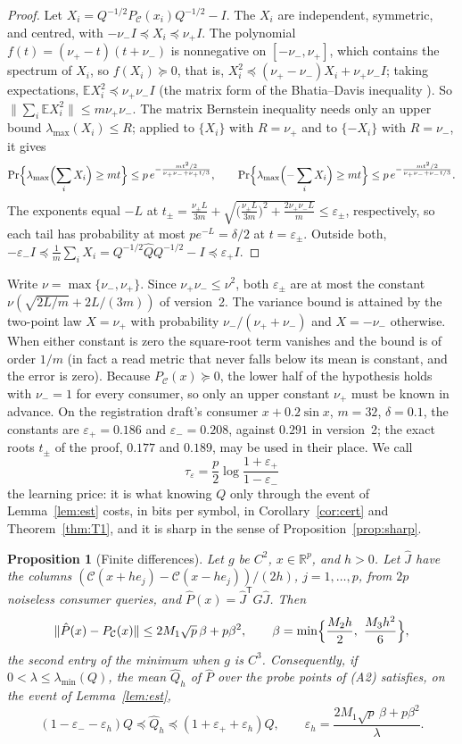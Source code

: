 \documentclass[11pt,onecolumn]{IEEEtran}
\newtheorem{proposition}[theorem]{Proposition}
\newcommand{\E}{\mathbb{E}}
\newcommand{\R}{\mathbb{R}}
\newcommand{\PC}{P_{\mathcal C}}
\newcommand{\nup}{\nu_{+}}
\newcommand{\num}{\nu_{-}}
\newcommand{\epp}{\varepsilon_{+}}
\newcommand{\emm}{\varepsilon_{-}}
\newcommand{\lmin}{\lambda_{\min}}
\newcommand{\lmax}{\lambda_{\max}}
\begin{document}
\begin{proof}
Let $X_i=Q^{-1/2}\PC(x_i)Q^{-1/2}-I$. The $X_i$ are independent, symmetric, and
centred, with $-\num I\preceq X_i\preceq\nup I$. The polynomial
$f(t)=(\nup-t)(t+\num)$ is nonnegative on $[-\num,\nup]$, which contains the
spectrum of $X_i$, so $f(X_i)\succeq0$, that is,
$X_i^2\preceq(\nup-\num)X_i+\nup\num I$; taking expectations,
$\E X_i^2\preceq\nup\num I$ (the matrix form of the Bhatia--Davis inequality
\cite{bhatiadavis}). So $\|\sum_i\E X_i^2\|\le m\nup\num$. The matrix
Bernstein inequality \cite[Theorem~1.4]{tropp2012} needs only an upper bound
$\lmax(X_i)\le R$; applied to $\{X_i\}$ with $R=\nup$ and to $\{-X_i\}$ with
$R=\num$, it gives
\[
\Pr\Bigl\{\lmax\Bigl(\sum_iX_i\Bigr)\ge mt\Bigr\}\le p\,e^{-\frac{mt^2/2}{\nup\num+\nup t/3}},\qquad
\Pr\Bigl\{\lmax\Bigl(-\sum_iX_i\Bigr)\ge mt\Bigr\}\le p\,e^{-\frac{mt^2/2}{\nup\num+\num t/3}}.
\]
The exponents equal $-L$ at
$t_\pm=\frac{\nu_\pm L}{3m}+\sqrt{\bigl(\frac{\nu_\pm L}{3m}\bigr)^2+\frac{2\nup\num L}m}\le\varepsilon_\pm$,
respectively, so each tail has probability at most $pe^{-L}=\delta/2$ at $t=\varepsilon_\pm$. Outside both,
$-\emm I\preceq\tfrac1m\sum_iX_i=Q^{-1/2}\hat QQ^{-1/2}-I\preceq\epp I$.
\end{proof}

Write $\nu=\max\{\num,\nup\}$. Since $\nup\num\le\nu^2$, both $\varepsilon_\pm$ are at
most the constant $\nu(\sqrt{2L/m}+2L/(3m))$ of version~2. The variance bound is
attained by the two-point law $X=\nup$ with probability $\num/(\nup+\num)$ and $X=-\num$
otherwise. When either constant is zero the square-root term vanishes and the
bound is of order $1/m$ (in fact a read metric that never falls below its mean is
constant, and the error is zero). Because $\PC(x)\succeq0$, the lower half of the
hypothesis holds with $\num=1$ for every consumer, so only an upper constant $\nup$ must
be known in advance. On the registration draft's consumer $x+0.2\sin x$, $m=32$,
$\delta=0.1$, the constants are $\epp=0.186$ and $\emm=0.208$, against $0.291$ in
version~2; the exact roots $t_\pm$ of the proof, $0.177$ and $0.189$, may be used in
their place. We call
\[
\tau_\varepsilon=\frac p2\log\frac{1+\epp}{1-\emm}
\]
the learning price: it is what knowing $Q$ only through the event of
Lemma~\ref{lem:est} costs, in bits per symbol, in Corollary~\ref{cor:cert} and
Theorem~\ref{thm:T1}, and it is sharp in the sense of Proposition~\ref{prop:sharp}.

\begin{proposition}[Finite differences]\label{prop:fd}
Let $g$ be $C^2$, $x\in\R^p$, and $h>0$. Let $\hat J$ have the columns
$(\mathcal C(x+he_j)-\mathcal C(x-he_j))/(2h)$, $j=1,\dots,p$, from $2p$ noiseless consumer
queries, and $\hat P(x)=\hat J^{\mathsf T}G\hat J$. Then
\[
\|\hat P(x)-\PC(x)\|\le 2M_1\sqrt p\,\beta+p\beta^2,\qquad
\beta=\min\Bigl\{\frac{M_2h}2,\ \frac{M_3h^2}6\Bigr\},
\]
the second entry of the minimum when $g$ is $C^3$. Consequently, if
$0<\lambda\le\lmin(Q)$, the mean $\hat Q_h$ of $\hat P$ over the probe points of (A2)
satisfies, on the event of Lemma~\ref{lem:est},
\[
(1-\emm-\varepsilon_h)Q\preceq\hat Q_h\preceq(1+\epp+\varepsilon_h)Q,\qquad
\varepsilon_h=\frac{2M_1\sqrt p\,\beta+p\beta^2}{\lambda}.
\]
\end{proposition}
\end{document}
